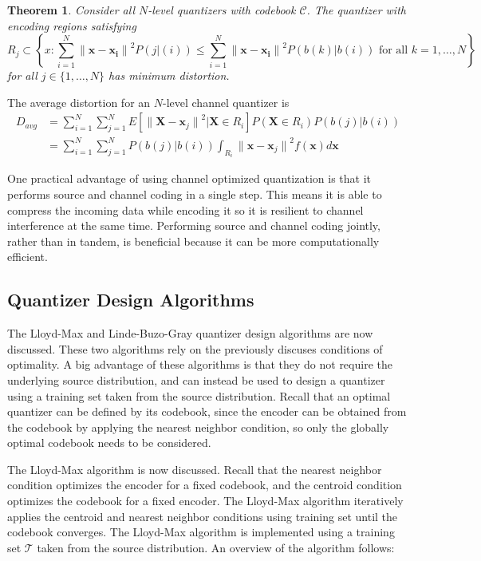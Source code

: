 \documentclass[10pt,twoside,titlepage]{article}
\newtheorem{theorem}{Theorem}[section]
\newcommand{\bx}{\mathbf{x}}
\newcommand{\bX}{\mathbf{X}}
\begin{document}
\begin{theorem}
Consider all $N$-level quantizers with codebook $\mathcal{C}$. The quantizer with encoding regions satisfying
\begin{equation*}
R_j \subset \left\{x : \sum_{i=1}^N {\| \mathbf{x} - \mathbf{x_i} \|}^2P(j|(i)) \le \sum_{i=1}^N {\| \mathbf{x} - \mathbf{x_i} \|}^2P(b(k)|b(i)) \text{ for all } k = 1,\ldots,N \right\}
\end{equation*}
for all $j \in \{1,\ldots,N\}$ has minimum distortion.
\end{theorem}

The average distortion for an $N$-level channel quantizer is
\begin{align}
  \label{eq:channel_dist}
D_{avg} &= \sum_{i=1}^{N} \sum_{j=1}^{N} E[ {\|\bX - \bx_j\|}^2 | \bX \in R_i] P(\bX \in R_i) P(b(j)|b(i))\\
&= \sum_{i=1}^{N} \sum_{j=1}^{N} P(b(j)|b(i)) \int_{R_i} {\|\bx - \bx_j\|}^2 f(\bx) d\bx
\end{align}

One practical advantage of using channel optimized quantization  is that it performs source and channel coding in a single step. This means it is able to compress the incoming data while encoding it so it is resilient to channel interference at the same time. Performing source and channel coding jointly, rather than in tandem, is beneficial because it can be more computationally efficient.

\subsection{Quantizer Design Algorithms}
\label{sec:quant_design_algos}
The Lloyd-Max and Linde-Buzo-Gray quantizer design algorithms are now discussed. These two algorithms rely on the previously discuses conditions of optimality. A big advantage of these algorithms is that they do not require the underlying source distribution, and can instead be used to design a quantizer using a training set taken from the source distribution. Recall that an optimal quantizer can be defined by its codebook, since the encoder can be obtained from the codebook by applying the nearest neighbor condition, so only the globally optimal codebook needs to be considered.

The Lloyd-Max algorithm is now discussed. Recall that the nearest neighbor condition optimizes the encoder for a fixed codebook, and the centroid condition optimizes the codebook for a fixed encoder. The Lloyd-Max algorithm iteratively applies the centroid and nearest neighbor conditions using training set until the codebook converges. The Lloyd-Max algorithm is implemented using a training set $\mathcal{T}$ taken from the source distribution. An overview of the algorithm follows:
\end{document}
